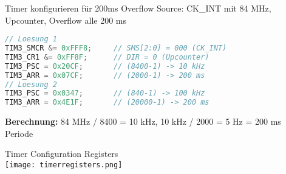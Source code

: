 \begin{example2}{Timer konfigurieren für 200ms Overflow}
    Source: CK\_INT mit 84 MHz, Upcounter, Overflow alle 200 ms
\begin{lstlisting}[language=C, style=basesmol]
// Loesung 1
TIM3_SMCR &= 0xFFF8;     // SMS[2:0] = 000 (CK_INT)
TIM3_CR1 &= 0xFF8F;      // DIR = 0 (Upcounter)
TIM3_PSC = 0x20CF;       // (8400-1) -> 10 kHz
TIM3_ARR = 0x07CF;       // (2000-1) -> 200 ms
// Loesung 2
TIM3_PSC = 0x0347;       // (840-1) -> 100 kHz
TIM3_ARR = 0x4E1F;       // (20000-1) -> 200 ms
\end{lstlisting}
    
    \textbf{Berechnung:}
    84 MHz / 8400 = 10 kHz, 10 kHz / 2000 = 5 Hz = 200 ms Periode
\end{example2}



\begin{concept}{Timer Configuration Registers}\\
\texttt{[image: timerregisters.png]}
\end{concept}

